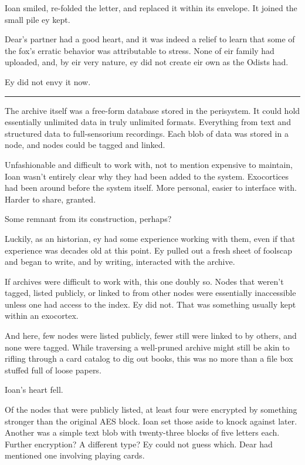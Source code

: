 Ioan smiled, re-folded the letter, and replaced it within its envelope. It joined the small pile ey kept.

Dear's partner had a good heart, and it was indeed a relief to learn that some of the fox's erratic behavior was attributable to stress. None of eir family had uploaded, and, by eir very nature, ey did not create eir own as the Odists had.

Ey did not envy it now.

\begin{center}\rule{0.5\linewidth}{0.5pt}\end{center}

The archive itself was a free-form database stored in the perisystem. It could hold essentially unlimited data in truly unlimited formats. Everything from text and structured data to full-sensorium recordings. Each blob of data was stored in a node, and nodes could be tagged and linked.

Unfashionable and difficult to work with, not to mention expensive to maintain, Ioan wasn't entirely clear why they had been added to the system. Exocortices had been around before the system itself. More personal, easier to interface with. Harder to share, granted.

Some remnant from its construction, perhaps?

Luckily, as an historian, ey had some experience working with them, even if that experience was decades old at this point. Ey pulled out a fresh sheet of foolscap and began to write, and by writing, interacted with the archive.

If archives were difficult to work with, this one doubly so. Nodes that weren't tagged, listed publicly, or linked to from other nodes were essentially inaccessible unless one had access to the index. Ey did not. That was something usually kept within an exocortex.

And here, few nodes were listed publicly, fewer still were linked to by others, and none were tagged. While traversing a well-pruned archive might still be akin to rifling through a card catalog to dig out books, this was no more than a file box stuffed full of loose papers.

Ioan's heart fell.

Of the nodes that were publicly listed, at least four were encrypted by something stronger than the original AES block. Ioan set those aside to knock against later. Another was a simple text blob with twenty-three blocks of five letters each. Further encryption? A different type? Ey could not guess which. Dear had mentioned one involving playing cards.

